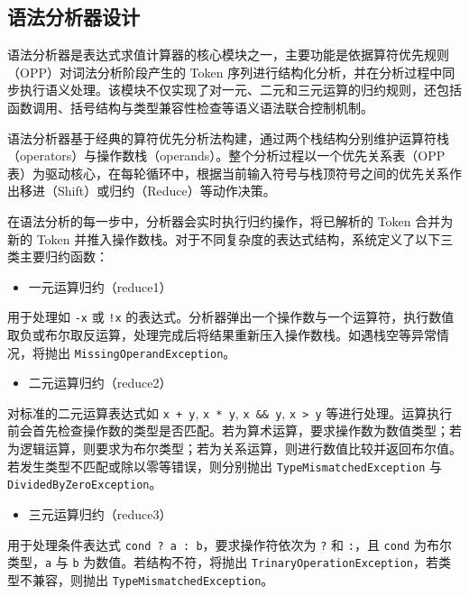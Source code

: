 \documentclass[a4paper, twoside, utf8]{ctexart}
\begin{document}
    \subsection{语法分析器设计}

    语法分析器是表达式求值计算器的核心模块之一，主要功能是依据算符优先规则（OPP）对词法分析阶段产生的 Token 序列进行结构化分析，并在分析过程中同步执行语义处理。该模块不仅实现了对一元、二元和三元运算的归约规则，还包括函数调用、括号结构与类型兼容性检查等语义语法联合控制机制。

    语法分析器基于经典的算符优先分析法构建，通过两个栈结构分别维护运算符栈（operators）与操作数栈（operands）。整个分析过程以一个优先关系表（OPP 表）为驱动核心，在每轮循环中，根据当前输入符号与栈顶符号之间的优先关系作出移进（Shift）或归约（Reduce）等动作决策。
    
    在语法分析的每一步中，分析器会实时执行归约操作，将已解析的 Token 合并为新的 Token 并推入操作数栈。对于不同复杂度的表达式结构，系统定义了以下三类主要归约函数：
    
    \begin{itemize}[itemsep=0pt, topsep=2pt, parsep=2pt]
        \item 一元运算归约（reduce1）
    \end{itemize}
    
    用于处理如 \verb|-x| 或 \verb|!x| 的表达式。分析器弹出一个操作数与一个运算符，执行数值取负或布尔取反运算，处理完成后将结果重新压入操作数栈。如遇栈空等异常情况，将抛出 \verb|MissingOperandException|。
    
    \begin{itemize}[itemsep=0pt, topsep=2pt, parsep=2pt]
        \item 二元运算归约（reduce2）
    \end{itemize}
    
    对标准的二元运算表达式如 \verb|x + y|, \verb|x * y|, \verb|x && y|, \verb|x > y| 等进行处理。运算执行前会首先检查操作数的类型是否匹配。若为算术运算，要求操作数为数值类型；若为逻辑运算，则要求为布尔类型；若为关系运算，则进行数值比较并返回布尔值。若发生类型不匹配或除以零等错误，则分别抛出 \verb|TypeMismatchedException| 与 \verb|DividedByZeroException|。
    
    \begin{itemize}[itemsep=0pt, topsep=2pt, parsep=2pt]
        \item 三元运算归约（reduce3）
    \end{itemize}
    
    用于处理条件表达式 \verb|cond ? a : b|，要求操作符依次为 \verb|?| 和 \verb|:|，且 \verb|cond| 为布尔类型，\verb|a| 与 \verb|b| 为数值。若结构不符，将抛出 \verb|TrinaryOperationException|，若类型不兼容，则抛出 \verb|TypeMismatchedException|。
\end{document}
